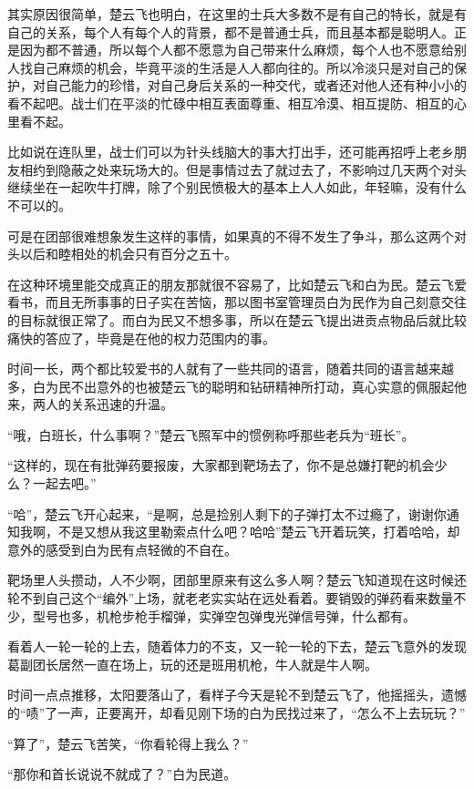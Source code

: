 其实原因很简单，楚云飞也明白，在这里的士兵大多数不是有自己的特长，就是有自己的关系，每个人有每个人的背景，都不是普通士兵，而且基本都是聪明人。正是因为都不普通，所以每个人都不愿意为自己带来什么麻烦，每个人也不愿意给别人找自己麻烦的机会，毕竟平淡的生活是人人都向往的。所以冷淡只是对自己的保护，对自己能力的珍惜，对自己身后关系的一种交代，或者还对他人还有种小小的看不起吧。战士们在平淡的忙碌中相互表面尊重、相互冷漠、相互提防、相互的心里看不起。

比如说在连队里，战士们可以为针头线脑大的事大打出手，还可能再招呼上老乡朋友相约到隐蔽之处来玩场大的。但是事情过去了就过去了，不影响过几天两个对头继续坐在一起吹牛打牌，除了个别民愤极大的基本上人人如此，年轻嘛，没有什么不可以的。

可是在团部很难想象发生这样的事情，如果真的不得不发生了争斗，那么这两个对头以后和睦相处的机会只有百分之五十。

在这种环境里能交成真正的朋友那就很不容易了，比如楚云飞和白为民。楚云飞爱看书，而且无所事事的日子实在苦恼，那以图书室管理员白为民作为自己刻意交往的目标就很正常了。而白为民又不想多事，所以在楚云飞提出进贡点物品后就比较痛快的答应了，毕竟是在他的权力范围内的事。

时间一长，两个都比较爱书的人就有了一些共同的语言，随着共同的语言越来越多，白为民不出意外的也被楚云飞的聪明和钻研精神所打动，真心实意的佩服起他来，两人的关系迅速的升温。

“哦，白班长，什么事啊？”楚云飞照军中的惯例称呼那些老兵为“班长”。

“这样的，现在有批弹药要报废，大家都到靶场去了，你不是总嫌打靶的机会少么？一起去吧。”

“哈”，楚云飞开心起来，“是啊，总是捡别人剩下的子弹打太不过瘾了，谢谢你通知我啊，不是又想从我这里勒索点什么吧？哈哈”楚云飞开着玩笑，打着哈哈，却意外的感受到白为民有点轻微的不自在。

靶场里人头攒动，人不少啊，团部里原来有这么多人啊？楚云飞知道现在这时候还轮不到自己这个“编外”上场，就老老实实站在远处看着。要销毁的弹药看来数量不少，型号也多，机枪步枪手榴弹，实弹空包弹曳光弹信号弹，什么都有。

看着人一轮一轮的上去，随着体力的不支，又一轮一轮的下去，楚云飞意外的发现葛副团长居然一直在场上，玩的还是班用机枪，牛人就是牛人啊。

时间一点点推移，太阳要落山了，看样子今天是轮不到楚云飞了，他摇摇头，遗憾的“啧”了一声，正要离开，却看见刚下场的白为民找过来了，“怎么不上去玩玩？”

“算了”，楚云飞苦笑，“你看轮得上我么？”

“那你和首长说说不就成了？”白为民道。

